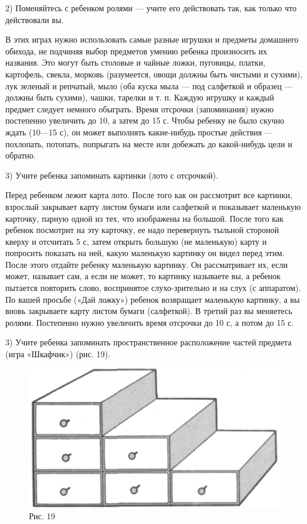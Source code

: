 \documentclass{book}
\begin{document}
2) Поменяйтесь с ребенком ролями --- учите его действовать так, как
только что действовали вы.

В этих играх нужно использовать самые разные игрушки и предметы
домашнего обихода, не подчиняя выбор предметов умению ребенка
произносить их названия. Это могут быть столовые и чайные ложки,
пуговицы, платки, картофель, свекла, морковь (разумеется, овощи должны
быть чистыми и сухими), лук зеленый и репчатый, мыло (оба куска мыла ---
под салфеткой и образец --- должны быть сухими), чашки, тарелки и т. п.
Каждую игрушку и каждый предмет следует немного обыграть. Время отсрочки
(запоминания) нужно постепенно увеличить до 10, а затем до 15 с. Чтобы
ребенку не было скучно ждать (10---15 с), он может выполнять
какие-нибудь простые действия --- похлопать, потопать, попрыгать на
месте или добежать до какой-нибудь цели и обратно.

3) Учите ребенка запоминать картинки (лото с отсрочкой).

Перед ребенком лежит карта лото. После того как он рассмотрит все
картинки, взрослый закрывает карту листом бумаги или салфеткой и
показывает маленькую карточку, парную одной из тех, что изображены на
большой. После того как ребенок посмотрит на эту карточку, ее надо
перевернуть тыльной стороной кверху и отсчитать 5 с, затем открыть
большую (не маленькую) карту и попросить показать на ней, какую
маленькую картинку он видел перед этим. После этого отдайте ребенку
маленькую картинку. Он рассматривает их, если может, называет сам, а
если не может, то картинку называете вы, а ребенок пытается повторить
слово, воспринятое слухо-зрительно и на слух (с аппаратом). По вашей
просьбе («Дай ложку») ребенок возвращает маленькую картинку, а вы вновь
закрываете карту листом бумаги (салфеткой). В третий раз вы меняетесь
ролями. Постепенно нужно увеличить время отсрочки до 10 с, а потом до 15
с.

3) Учите ребенка запоминать пространственное расположение частей
предмета (игра «Шкафчик») (рис. 19).

\begin{figure}
\centering
\includegraphics[width=0.5\linewidth]{media/media/image16.png}
\caption*{Рис. 19}
\end{figure}
\end{document}
